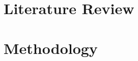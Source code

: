 \documentclass[12pt]{report}
\begin{document}
\chapter{Literature Review}
\label{ch:chapter-02}


\chapter{Methodology}
\label{ch:chapter-03}




\end{document}
